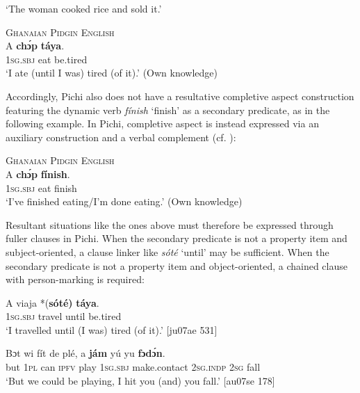\glt ‘The woman cooked rice and sold it.’ \citep[72]{Finney2004}
\z


\ea%
    \label{ex:key:1607}
\textsc{Ghanaian Pidgin English}\\
    \gll A    \textbf{chɔ́p}  \textbf{táya}.\\
\textsc{1sg.sbj}  eat    be.tired  \\

\glt ‘I ate (until I was) tired (of it).’ (Own knowledge)
\z

Accordingly, Pichi also does not have a resultative completive aspect construction featuring the dynamic verb \textit{fínish} ‘finish’ as a secondary predicate, as in the following example. In Pichi, completive aspect is instead expressed via an auxiliary construction and a verbal complement (cf. ):


\ea%
    \label{ex:key:1608}
\textsc{Ghanaian Pidgin English}\\
    \gll A    \textbf{chɔ́p}  \textbf{fínish}.\\
\textsc{1sg.sbj}  eat    finish  \\

\glt ‘I’ve finished eating/I’m done eating.’ (Own knowledge)
\z

Resultant situations like the ones above must therefore be expressed through fuller clauses in Pichi. When the secondary predicate is not a property item and subject-ori\-ent\-ed, a clause linker like \textit{sóté} ‘until’ may be sufficient. When the secondary predicate is not a property item and object-oriented, a chained clause with person-marking is required:


\ea%
    \label{ex:key:1609}
    \gll A    viaja  *(\textbf{sóté}\textbf{\textmd{)}}  \textbf{táya}.\\
\textsc{1sg.sbj}  travel   \phantom{*(}until  be.tired\\

\glt ‘I travelled until (I was) tired (of it).’ [ju07ae 531]
\z


\ea%
    \label{ex:key:1610}
    \gll Bɔt  wi  fít  de  plé,  a    \textbf{jám}        yú    yu  \textbf{fɔdɔ́n}.\\
but  \textsc{1pl}  can  \textsc{ipfv}  play  \textsc{1sg.sbj}  make.contact    \textsc{2sg.indp}  \textsc{2sg}  fall\\

\glt ‘But we could be playing, I hit you (and) you fall.’ [au07se 178]
\z

